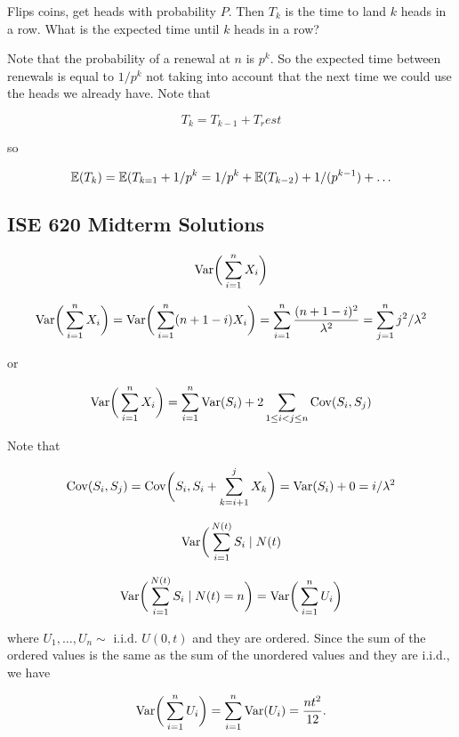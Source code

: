 \begin{example}Flips coins, get heads with probability \(P\). Then \(T_{k}\) is the time to land \(k\) heads in a row. What is the expected time until \(k\) heads in a row?

\begin{solution} Note that the probability of a renewal at \(n\) is \(p^k\). So the expected time between renewals is equal to \(1/p^k\) not taking into account that the next time we could use the heads we already have. Note that

\[
T_k = T_{k-1} + T_rest
\] 

so

\[
\E(T_k) = \E(T_{k=1} + 1/p^k = 1/p^k + \E(T_{k-2}) + 1/(p^{k-1}) + \ldots
\]

\end{solution}

\end{example}

\subsection{ISE 620 Midterm Solutions}


\begin{exercise}

\[
\Var \bigg( \sum_{i=1}^n X_i \bigg) 
\]

\end{exercise}
\begin{solution} 

\[
\Var \bigg( \sum_{i=1}^n X_i \bigg) = \Var \bigg( \sum_{i=1}^n (n + 1 - i) X_i \bigg) = \sum_{i=1}^n \frac{(n + 1 - i)^2}{\lambda^2} = \sum_{j=1}^n j^2/\lambda^2
\]

or

\[
\Var \bigg( \sum_{i=1}^n X_i \bigg) = \sum_{i=1}^n \Var(S_i) +2  \sum_{1 \leq i < j \leq n} \Cov(S_i, S_j) 
\]

Note that 

\[
 \Cov(S_i, S_j)  = \Cov \bigg(S_i, S_i + \sum_{k=i+1}^j X_k \bigg) = \Var(S_i) + 0 = i/\lambda^2
\]

\end{solution}

\begin{exercise}

\[
\Var \bigg( \sum_{i=1}^{N(t)} S_i \mid N(t) 
\]

\end{exercise}

\begin{solution} 

\[
\Var \bigg( \sum_{i=1}^{N(t)} S_i \mid N(t) = n \bigg) = \Var \bigg( \sum_{i=1}^{n} U_i \bigg) 
\]

where \(U_1, \ldots, U_n \sim \text{ i.i.d. } U(0,t)\) and they are ordered. Since the sum of the ordered values is the same as the sum of the unordered values and they are i.i.d., we have

\[
 \Var \bigg( \sum_{i=1}^{n} U_i \bigg)  =  \sum_{i=1}^{n} \Var(U_i ) =  \frac{n t^2}{12}.
 \]


\end{solution}

